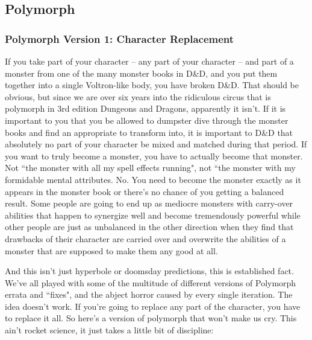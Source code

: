 \subsection{Polymorph}

\subsubsection{Polymorph Version 1: Character Replacement}

If you take part of your character -- any part of your character -- and part of a monster from one of the many monster books in D\&D, and you put them together into a single Voltron-like body, you have broken D\&D. That should be obvious, but since we are over six years into the ridiculous circus that is polymorph in 3rd edition Dungeons and Dragons, apparently it isn't. If it is important to you that you be allowed to dumpster dive through the monster books and find an appropriate to transform into, it is important to D\&D that absolutely no part of your character be mixed and matched during that period. If you want to truly become a monster, you have to actually become that monster. Not ``the monster with all my spell effects running", not ``the monster with my formidable mental attributes. No. You need to become the monster exactly as it appears in the monster book or there's no chance of you getting a balanced result. Some people are going to end up as mediocre monsters with carry-over abilities that happen to synergize well and become tremendously powerful while other people are just as unbalanced in the other direction when they find that drawbacks of their character are carried over and overwrite the abilities of a monster that are supposed to make them any good at all.

And this isn't just hyperbole or doomsday predictions, this is established fact. We've all played with some of the multitude of different versions of Polymorph errata and ``fixes", and the abject horror caused by every single iteration. The idea doesn't work. If you're going to replace any part of the character, you have to replace it all. So here's a version of polymorph that won't make us cry. This ain't rocket science, it just takes a little bit of discipline:

